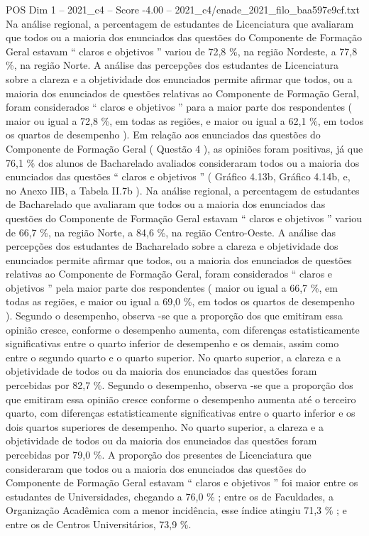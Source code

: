 \begin{textsample}{POS Dim 1 – 2021\_c4 – Score -4.00 – 2021\_c4/enade\_2021\_filo\_baa597e9cf.txt}
Na análise regional, a percentagem de estudantes de Licenciatura que avaliaram que todos ou a maioria dos enunciados das questões do Componente de Formação Geral estavam “ claros e objetivos ” variou de 72,8 \%, na região Nordeste, a 77,8 \%, na região Norte.
A análise das percepções dos estudantes de Licenciatura sobre a clareza e a objetividade dos enunciados permite afirmar que todos, ou a maioria dos enunciados de questões relativas ao Componente de Formação Geral, foram considerados “ claros e objetivos ” para a maior parte dos respondentes ( maior ou igual a 72,8 \%, em todas as regiões, e maior ou igual a 62,1 \%, em todos os quartos de desempenho ).
Em relação aos enunciados das questões do Componente de Formação Geral ( Questão 4 ), as opiniões foram positivas, já que 76,1 \% dos alunos de Bacharelado avaliados consideraram todos ou a maioria dos enunciados das questões “ claros e objetivos ” ( Gráfico 4.13b, Gráfico 4.14b, e, no Anexo IIB, a Tabela II.7b ).
Na análise regional, a percentagem de estudantes de Bacharelado que avaliaram que todos ou a maioria dos enunciados das questões do Componente de Formação Geral estavam “ claros e objetivos ” variou de 66,7 \%, na região Norte, a 84,6 \%, na região Centro-Oeste.
A análise das percepções dos estudantes de Bacharelado sobre a clareza e objetividade dos enunciados permite afirmar que todos, ou a maioria dos enunciados de questões relativas ao Componente de Formação Geral, foram considerados “ claros e objetivos ” pela maior parte dos respondentes ( maior ou igual a 66,7 \%, em todas as regiões, e maior ou igual a 69,0 \%, em todos os quartos de desempenho ).
Segundo o desempenho, observa -se que a proporção dos que emitiram essa opinião cresce, conforme o desempenho aumenta, com diferenças estatisticamente significativas entre o quarto inferior de desempenho e os demais, assim como entre o segundo quarto e o quarto superior.
No quarto superior, a clareza e a objetividade de todos ou da maioria dos enunciados das questões foram percebidas por 82,7 \%.
Segundo o desempenho, observa -se que a proporção dos que emitiram essa opinião cresce conforme o desempenho aumenta até o terceiro quarto, com diferenças estatisticamente significativas entre o quarto inferior e os dois quartos superiores de desempenho.
No quarto superior, a clareza e a objetividade de todos ou da maioria dos enunciados das questões foram percebidas por 79,0 \%.
A proporção dos presentes de Licenciatura que consideraram que todos ou a maioria dos enunciados das questões do Componente de Formação Geral estavam “ claros e objetivos ” foi maior entre os estudantes de Universidades, chegando a 76,0 \% ; entre os de Faculdades, a Organização Acadêmica com a menor incidência, esse índice atingiu 71,3 \% ; e entre os de Centros Universitários, 73,9 \%.

\end{textsample}

